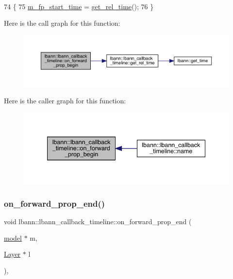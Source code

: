 \begin{DoxyCode}
74                                                                       \{
75   \hyperlink{classlbann_1_1lbann__callback__timeline_a5c24aa919edfcd34fce577ef17e9153f}{m\_fp\_start\_time} = \hyperlink{classlbann_1_1lbann__callback__timeline_a67da1376356bf2153ab67489014e0ad4}{get\_rel\_time}();
76 \}
\end{DoxyCode}
Here is the call graph for this function\+:\nopagebreak
\begin{figure}[H]
\begin{center}
\leavevmode
\includegraphics[width=350pt]{classlbann_1_1lbann__callback__timeline_a9c093b091fd38b79f8632cf786d29ce2_cgraph}
\end{center}
\end{figure}
Here is the caller graph for this function\+:\nopagebreak
\begin{figure}[H]
\begin{center}
\leavevmode
\includegraphics[width=340pt]{classlbann_1_1lbann__callback__timeline_a9c093b091fd38b79f8632cf786d29ce2_icgraph}
\end{center}
\end{figure}
\mbox{\label{classlbann_1_1lbann__callback__timeline_a28f4387fda222bf988d744e0b2ec8b4b}} 
\subsubsection{\texorpdfstring{on\+\_\+forward\+\_\+prop\+\_\+end()}{on\_forward\_prop\_end()}}
{\footnotesize\ttfamily void lbann\+::lbann\+\_\+callback\+\_\+timeline\+::on\+\_\+forward\+\_\+prop\+\_\+end (\begin{DoxyParamCaption}\item[{\hyperlink{classlbann_1_1model}{model} $\ast$}]{m,  }\item[{\hyperlink{classlbann_1_1Layer}{Layer} $\ast$}]{l }\end{DoxyParamCaption})\hspace{0.3cm}{\ttfamily [override]}, {\ttfamily [virtual]}}

